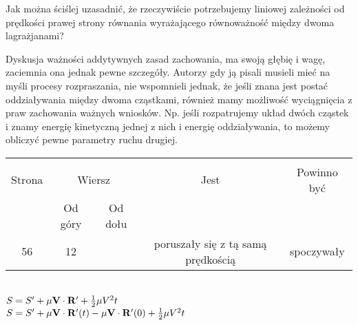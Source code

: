 \documentclass[a4paper,11pt]{article}
\begin{document}
\vspace{\spaceFour}


\start {} Jak można ściślej uzasadnić, że rzeczywiście
potrzebujemy liniowej zależności od prędkości prawej strony równania
wyrażającego równoważność między dwoma lagrażjanami? \Dok

\vspace{\spaceFour}


\start {} Dyskusja ważności addytywnych zasad zachowania, ma
swoją głębię i wagę, zaciemnia ona jednak pewne szczegóły. Autorzy gdy
ją pisali musieli mieć na myśli procesy rozpraszania, nie wspomnieli
jednak, że jeśli znana jest postać oddziaływania między dwoma
cząstkami, również mamy możliwość wyciągnięcia z praw zachowania
ważnych wniosków. Np. jeśli rozpatrujemy układ dwóch cząstek i znamy
energię kinetyczną jednej z nich i energię oddziaływania, to możemy
obliczyć pewne parametry ruchu drugiej.







\begin{center}

  \begin{tabular}{|c|c|c|c|c|}
    \hline
    & \multicolumn{2}{c|}{} & & \\
    Strona & \multicolumn{2}{c|}{Wiersz} & Jest
                              & Powinno być \\ \cline{2-3}
    & Od góry & Od dołu & & \\
    \hline
    56  & 12 & & poruszały się z tą samą prędkością & spoczywały \\
    \hline
  \end{tabular}

\end{center}


\noindent
{} \\
\Jest  $S = S' + \mu \mathbf{V} \cdot \mathbf{R}' + \frac{ 1 }{ 2 } \mu V^{ 2 } t$ \\
\Powin $S = S' + \mu \mathbf{V} \cdot \mathbf{R}'( t ) - \mu \mathbf{V}
\cdot \mathbf{R}'( 0 ) + \frac{ 1 }{ 2 } \mu V^{ 2 } t$ \\


\vspace{\spaceTwo}
\end{document}
